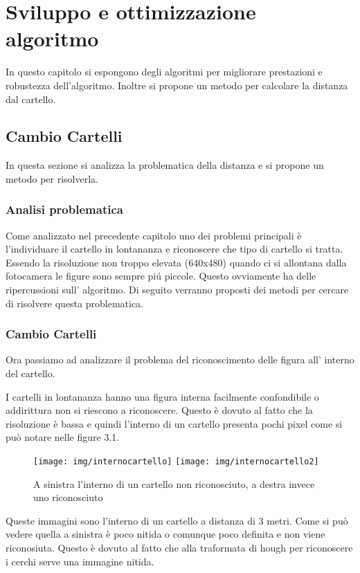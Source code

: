 \chapter{Sviluppo e ottimizzazione algoritmo}

In questo capitolo si espongono degli algoritmi per migliorare prestazioni e robustezza dell'algoritmo. Inoltre si propone un metodo per calcolare la distanza dal cartello.

\section{Cambio Cartelli}

	In questa sezione si analizza la problematica della distanza e si propone un metodo per risolverla.

	\subsection{Analisi problematica}
		Come analizzato nel precedente capitolo uno dei problemi principali è l'individuare il cartello in lontananza e riconoscere che tipo di cartello si tratta.
		Essendo la risoluzione non troppo elevata (640x480) quando ci si allontana dalla fotocamera le figure sono sempre pi\'u piccole. Questo ovviamente ha delle ripercussioni sull' algoritmo.
		Di seguito verranno proposti dei metodi per cercare di risolvere questa problematica.


	\subsection{Cambio Cartelli}
		Ora passiamo ad analizzare il problema del riconoscimento delle figura all' interno del cartello.

		I cartelli in lontananza hanno una figura interna facilmente confondibile o addirittura non si riescono a riconoscere. Questo è dovuto al fatto che la risoluzione è bassa e quindi l'interno di un cartello presenta pochi pixel come si può notare nelle figure 3.1.

		\begin{figure}[!ht]
			\centering
			\texttt{[image: img/internocartello]}
			\texttt{[image: img/internocartello2]}
			\caption[Interno cartelli]{A sinistra l'interno di un cartello non riconosciuto, a destra invece uno riconosciuto}
		\end{figure}
		
		Queste immagini sono l'interno di un cartello a distanza di 3 metri. Come si può vedere quella a sinistra è poco nitida o comunque poco definita e non viene riconosiuta. Questo è dovuto al fatto che alla traformata di hough per riconoscere i cerchi serve una immagine nitida.

